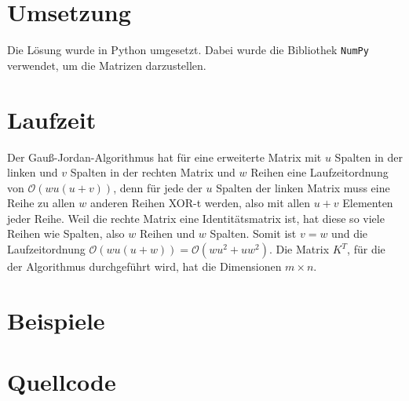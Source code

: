 \documentclass[a4paper,10pt,ngerman]{scrartcl}
\begin{document}
\section{Umsetzung}
Die Lösung wurde in Python umgesetzt. Dabei wurde die Bibliothek \lstinline|NumPy| verwendet, um die Matrizen darzustellen. 
\section{Laufzeit}
Der Gauß-Jordan-Algorithmus hat für eine erweiterte Matrix mit $u$ Spalten in der linken und $v$ Spalten in der rechten Matrix und $w$ Reihen eine Laufzeitordnung von $\mathcal{O}(wu(u+v))$, denn für jede der $u$ Spalten der linken Matrix muss eine Reihe zu allen $w$ anderen Reihen XOR-t werden, also mit allen $u+v$ Elementen jeder Reihe. Weil die rechte Matrix eine Identitätsmatrix ist, hat diese so viele Reihen wie Spalten, also $w$ Reihen und $w$ Spalten. Somit ist $v=w$ und die Laufzeitordnung $\mathcal{O}(wu(u+w))=\mathcal{O}(wu^2+uw^2)$. Die Matrix $K^T$, für die der Algorithmus durchgeführt wird, hat die Dimensionen $m \times n$. 
\section{Beispiele}

\section{Quellcode}



\end{document}
